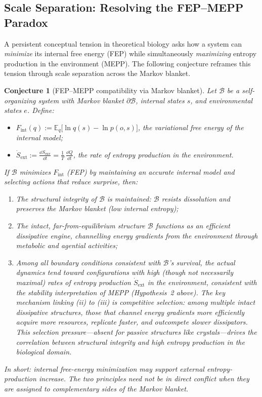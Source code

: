 \documentclass[12pt,a4paper]{article}
\newtheorem{conjecture}{Conjecture}
\theoremstyle{remark}
\begin{document}
\subsection{Scale Separation: Resolving the FEP--MEPP Paradox}
\label{sec:fep-mepp-paradox}

A persistent conceptual tension in theoretical biology asks how a system
can \emph{minimize} its internal free energy (FEP) while simultaneously
\emph{maximizing} entropy production in the environment (MEPP). The
following conjecture reframes this tension through scale separation
across the Markov blanket.

\begin{conjecture}[FEP--MEPP compatibility via Markov blanket]
\label{conj:fep-mepp}
Let $\mathcal{B}$ be a self-organizing system with Markov blanket
$\partial\mathcal{B}$, internal states $s$, and environmental
states $e$. Define:
\begin{itemize}
  \item $F_{\mathrm{int}}(q) :=
    \mathbb{E}_{q}\!\bigl[\ln q(s) - \ln p(o, s)\bigr]$,
    the variational free energy of the internal model;
  \item $\dot{S}_{\mathrm{ext}} :=
    \frac{\dd S_{\mathrm{env}}}{\dd t} =
    \frac{1}{T}\,\frac{\dd Q}{\dd t}$,
    the rate of entropy production in the environment.
\end{itemize}
If $\mathcal{B}$ minimizes $F_{\mathrm{int}}$ (FEP) by maintaining an
accurate internal model and selecting actions that reduce surprise, then:
\begin{enumerate}
  \item[\emph{(i)}] The structural integrity of $\mathcal{B}$ is
    maintained: $\mathcal{B}$ resists dissolution and preserves the
    Markov blanket (low internal entropy);
  \item[\emph{(ii)}] The intact, far-from-equilibrium structure
    $\mathcal{B}$ functions as an efficient dissipative engine,
    channelling energy gradients from the environment through
    metabolic and agential activities;
  \item[\emph{(iii)}] Among all boundary conditions consistent with
    $\mathcal{B}$'s survival, the actual dynamics tend toward
    configurations with high (though not necessarily maximal) rates
    of entropy production $\dot{S}_{\mathrm{ext}}$ in the environment,
    consistent with the stability interpretation of MEPP
    (Hypothesis~2 above). The key mechanism linking (ii) to (iii) is
    \emph{competitive selection}: among multiple intact dissipative
    structures, those that channel energy gradients more efficiently
    acquire more resources, replicate faster, and outcompete slower
    dissipators. This selection pressure---absent for passive
    structures like crystals---drives the correlation between
    structural integrity and high entropy production in the
    biological domain.
\end{enumerate}
In short: \emph{internal free-energy minimization may support external
entropy-production increase}. The two principles need not be in
direct conflict when they are assigned to complementary sides of the Markov blanket.
\end{conjecture}
\end{document}
